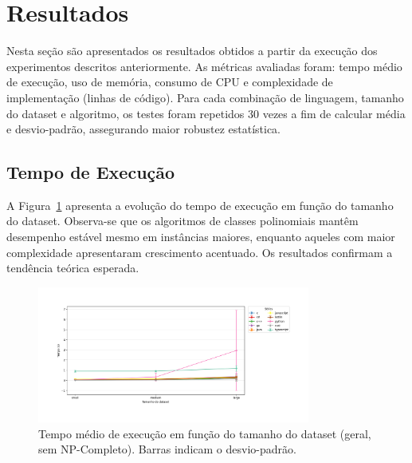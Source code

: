 \documentclass[12pt, a4paper]{article}
\begin{document}
\section{Resultados}

Nesta seção são apresentados os resultados obtidos a partir da execução dos experimentos descritos anteriormente. As métricas avaliadas foram: tempo médio de execução, uso de memória, consumo de CPU e complexidade de implementação (linhas de código). Para cada combinação de linguagem, tamanho do dataset e algoritmo, os testes foram repetidos 30 vezes a fim de calcular média e desvio-padrão, assegurando maior robustez estatística.

\subsection{Tempo de Execução}

A Figura~\ref{fig:tempo_execucao} apresenta a evolução do tempo de execução em função do tamanho do dataset. Observa-se que os algoritmos de classes polinomiais mantêm desempenho estável mesmo em instâncias maiores, enquanto aqueles com maior complexidade apresentaram crescimento acentuado. Os resultados confirmam a tendência teórica esperada.

\begin{figure}[H]
    \centering
    \includegraphics[width=0.8\textwidth]{img/tempo_vs_tamanho_all.png}
    \caption{Tempo médio de execução em função do tamanho do dataset (geral, sem NP-Completo). Barras indicam o desvio-padrão.}
    \label{fig:tempo_execucao}
\end{figure}
\end{document}
